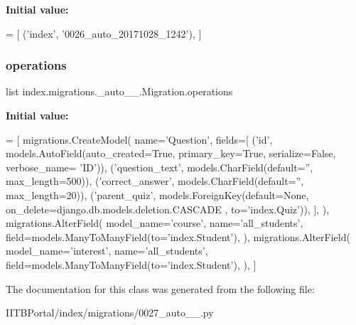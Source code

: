 {\bfseries Initial value\+:}
\begin{DoxyCode}
=  [
        (\textcolor{stringliteral}{'index'}, \textcolor{stringliteral}{'0026\_auto\_20171028\_1242'}),
    ]
\end{DoxyCode}
\mbox{\label{classindex_1_1migrations_1_10027__auto__20171028__1441_1_1Migration_abbfd752213f9d5fed1c5f30b65e31b1e}} 
\subsubsection{\texorpdfstring{operations}{operations}}
{\footnotesize\ttfamily list index.\+migrations.\+\_\+auto\+\_\+\_.\+Migration.\+operations\hspace{0.3cm}{\ttfamily [static]}}

{\bfseries Initial value\+:}
\begin{DoxyCode}
=  [
        migrations.CreateModel(
            name=\textcolor{stringliteral}{'Question'},
            fields=[
                (\textcolor{stringliteral}{'id'}, models.AutoField(auto\_created=\textcolor{keyword}{True}, primary\_key=\textcolor{keyword}{True}, serialize=\textcolor{keyword}{False}, verbose\_name=\textcolor{stringliteral}{
      'ID'})),
                (\textcolor{stringliteral}{'question\_text'}, models.CharField(default=\textcolor{stringliteral}{''}, max\_length=500)),
                (\textcolor{stringliteral}{'correct\_answer'}, models.CharField(default=\textcolor{stringliteral}{''}, max\_length=20)),
                (\textcolor{stringliteral}{'parent\_quiz'}, models.ForeignKey(default=\textcolor{keywordtype}{None}, on\_delete=django.db.models.deletion.CASCADE
      , to=\textcolor{stringliteral}{'index.Quiz'})),
            ],
        ),
        migrations.AlterField(
            model\_name=\textcolor{stringliteral}{'course'},
            name=\textcolor{stringliteral}{'all\_students'},
            field=models.ManyToManyField(to=\textcolor{stringliteral}{'index.Student'}),
        ),
        migrations.AlterField(
            model\_name=\textcolor{stringliteral}{'interest'},
            name=\textcolor{stringliteral}{'all\_students'},
            field=models.ManyToManyField(to=\textcolor{stringliteral}{'index.Student'}),
        ),
    ]
\end{DoxyCode}


The documentation for this class was generated from the following file\+:\begin{DoxyCompactItemize}
\item 
I\+I\+T\+B\+Portal/index/migrations/0027\+\_\+auto\+\_\+\_.\+py\end{DoxyCompactItemize}
